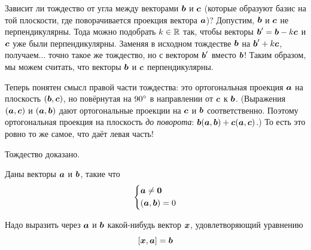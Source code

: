 \documentclass[a4paper,12pt]{article}
\begin{document}
\begin{solution}
    Зависит ли тождество от угла между векторами $\boldsymbol b$ и $\boldsymbol c$ (которые образуют базис на той плоскости, где поворачивается проекция вектора $\boldsymbol a$)?
    Допустим, $\boldsymbol b$ и $\boldsymbol c$ не перпендикулярны.
    Тода можно подобрать $k \hm\in \RR$ так, чтобы векторы $\bds b' \hm= \bds b \hm- k \bds c$ и $\boldsymbol c$ уже были перпендикулярны.
    Заменяя в исходном тождестве $\boldsymbol b$ на $\bds b' \hm+ k \bds c$, получаем... точно такое же тождество, но с вектором $\boldsymbol b'$ вместо $\boldsymbol b$!
    Таким образом, мы можем считать, что векторы $\boldsymbol b$ и $\boldsymbol c$ перпендикулярны.
    
    Теперь понятен смысл правой части тождества: это ортогональная проекция $\boldsymbol a$ на плоскость $(\boldsymbol b, \boldsymbol c)$, но повёрнутая на $90\degree$ в направлении от $\boldsymbol c$ к $\boldsymbol b$.
    (Выражения $(\boldsymbol a, \boldsymbol c)$ и $(\boldsymbol a, \boldsymbol b)$ дают ортогональные проекции на $\boldsymbol c$ и $\boldsymbol b$ соответственно.
    Поэтому ортогональная проекция на плоскость \emph{до поворота}: $\bds b (\bds a, \bds b) \hm+ \bds c (\bds a, \bds c)$.)
    То есть это ровно то же самое, что даёт левая часть!
    
    Тождество доказано.
  \end{solution}
  
  
  \begin{problem}[3.15]
    Даны векторы $\boldsymbol a$ и $\boldsymbol b$, такие что
    \[
      \left\{
        \begin{aligned}
          &\boldsymbol a \not= \boldsymbol 0\\
          &(\boldsymbol a, \boldsymbol b) = 0
        \end{aligned}
      \right.
    \]
    
    Надо выразить через $\boldsymbol a$ и $\boldsymbol b$ какой-нибудь вектор $\boldsymbol x$, удовлетворяющий уравнению
    \[
      [\boldsymbol x, \boldsymbol a] = \boldsymbol b
    \]
  \end{problem}
  
\end{document}
